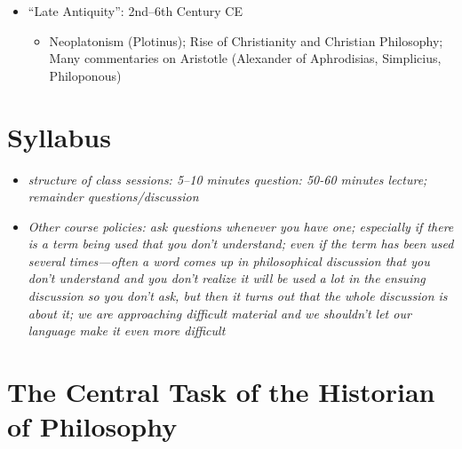 \documentclass[11pt]{article}
\begin{document}
\begin{itemize}
\begin{itemize}
\end{itemize}
\item{``Late Antiquity'': 2nd--6th Century CE}
\begin{itemize}
\item{Neoplatonism (Plotinus); Rise of Christianity and Christian Philosophy; Many commentaries on Aristotle (Alexander of Aphrodisias, Simplicius, Philoponous)}
\end{itemize}
\end{itemize}

\section*{Syllabus} 
\begin{itemize}
\item{\emph{structure of class sessions: 5--10 minutes question: 50-60 minutes lecture; remainder questions/discussion}}
\item{\emph{Other course policies: ask questions whenever you have one; especially if there is a term being used that you don't understand; even if the term has been used several times---often a word comes up in philosophical discussion that you don't understand and you don't realize it will be used a lot in the ensuing discussion so you don't ask, but then it turns out that the whole discussion is about it; we are approaching difficult material and we shouldn't let our language make it even more difficult}}\end{itemize}
\section*{The Central Task of the Historian of Philosophy}
\end{document}
